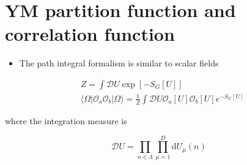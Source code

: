 \section{YM partition function and correlation function}

\begin{itemize}
  \item The path integral formalism is similar to scalar fields
\end{itemize}

\begin{equation}
\begin{aligned}
& Z=\int \mathcal{D} U \exp \left[-S_{G}[U]\right] \\
& \langle\Omega| \mathcal{O}_{a} \mathcal{O}_{b}|\Omega\rangle=\frac{1}{Z} \int \mathcal{D} U \mathcal{O}_{a}[U] \mathcal{O}_{b}[U] e^{-S_{G}[U]}
\end{aligned}
\end{equation}

where the integration measure is

\begin{equation}
\mathcal{D} U=\prod_{n \in \Lambda} \prod_{\mu=1}^{D} \text{d} U_{\mu}(n)
\end{equation}

